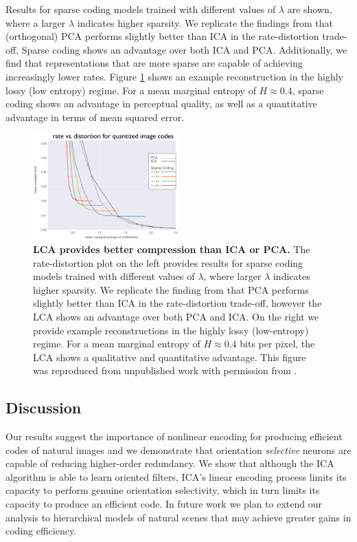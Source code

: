 Results for sparse coding models trained with different values of $\lambda$ are shown, where a larger $\lambda$ indicates higher sparsity. We replicate the findings from \parencite{eichhorn2009natural} that (orthogonal) PCA  performs slightly better than ICA in the rate-distortion trade-off. Sparse coding shows an advantage over both ICA and PCA. Additionally, we find that representations that are more sparse are capable of achieving increasingly lower rates. Figure \ref{fig:ch4_rate_distortion} shows an example reconstruction in the highly lossy (low entropy) regime. For a mean marginal entropy of $H\approx 0.4$, sparse coding shows an advantage in perceptual quality, as well as a quantitative advantage in terms of mean squared error.

\begin{figure}[ht]
    \centering
    \includegraphics[width=0.5\textwidth]{figures/rate_distortion.png}
    \caption{\textbf{LCA provides better compression than ICA or PCA.} The rate-distortion plot on the left provides results for sparse coding models trained with different values of $\lambda$, where larger $\lambda$ indicates higher sparsity. We replicate the finding from \parencite{eichhorn2009natural} that PCA performs slightly better than ICA in the rate-distortion trade-off, however the LCA shows an advantage over both PCA and ICA. On the right we provide example reconstructions in the highly lossy (low-entropy) regime. For a mean marginal entropy of $H \approx 0.4$ bits per pixel, the LCA shows a qualitative and quantitative advantage. This figure was reproduced from unpublished work with permission from \parencite{sanborn2016sampling}.}
    \label{fig:ch4_rate_distortion}
\end{figure}



\subsection{Discussion}
Our results suggest the importance of nonlinear encoding for producing efficient codes of natural images and we demonstrate that orientation \textit{selective} neurons are capable of reducing higher-order redundancy. We show that although the ICA algorithm is able to learn oriented filters, ICA's linear encoding process limits its capacity to perform genuine orientation selectivity, which in turn limits its capacity to produce an efficient code. In future work we plan to extend our analysis to hierarchical models of natural scenes that may achieve greater gains in coding efficiency.


